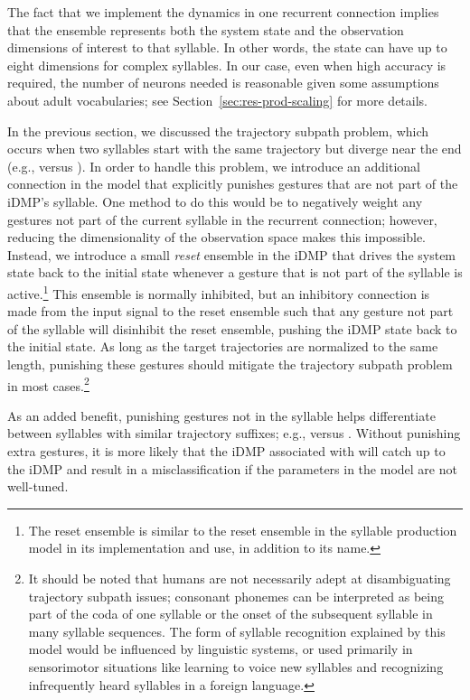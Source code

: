 The fact that we implement the dynamics
in one recurrent connection
implies that the ensemble
represents both the system state
and the observation dimensions
of interest to that syllable.
In other words, the state can have
up to eight dimensions for complex syllables.
In our case,
even when high accuracy is required,
the number of neurons needed
is reasonable given some assumptions
about adult vocabularies;
see Section~\ref{sec:res-prod-scaling}
for more details.

In the previous section, we discussed
the trajectory subpath problem,
which occurs when two syllables
start with the same trajectory
but diverge near the end
(e.g., \ipa{[bA]} versus \ipa{[bAr]}).
In order to handle this problem,
we introduce an additional connection
in the model that explicitly punishes
gestures that are not
part of the iDMP's syllable.
One method to do this would be to
negatively weight any gestures
not part of the current syllable
in the recurrent connection;
however, reducing the dimensionality
of the observation space makes
this impossible.
Instead, we introduce a small \textit{reset} ensemble
in the iDMP that drives
the system state back to the initial state
whenever a gesture that is not part
of the syllable is active.\footnote{
  The reset ensemble is similar to the reset ensemble
  in the syllable production model
  in its implementation and use,
  in addition to its name.}
This ensemble is normally inhibited,
but an inhibitory connection is made
from the input signal to the reset ensemble
such that any gesture
not part of the syllable will
disinhibit the reset ensemble,
pushing the iDMP state back to the initial state.
As long as the target trajectories
are normalized to the same length,
punishing these gestures should
mitigate the trajectory subpath problem
in most cases.\footnote{
  It should be noted that humans
  are not necessarily adept at
  disambiguating trajectory subpath issues;
  consonant phonemes can be interpreted
  as being part of the coda of one syllable
  or the onset of the subsequent syllable
  in many syllable sequences.
  The form of syllable recognition
  explained by this model would
  be influenced by linguistic systems,
  or used primarily in sensorimotor situations
  like learning to voice new syllables
  and recognizing infrequently heard syllables
  in a foreign language.}

As an added benefit,
punishing gestures not in the syllable helps
differentiate between syllables with
similar trajectory suffixes;
e.g., \ipa{[bAr]} versus \ipa{[dAr]}.
Without punishing extra gestures,
it is more likely that the iDMP
associated with \ipa{[dAr]} will catch up
to the \ipa{[bAr]} iDMP
and result in a misclassification
if the parameters in the model
are not well-tuned.

